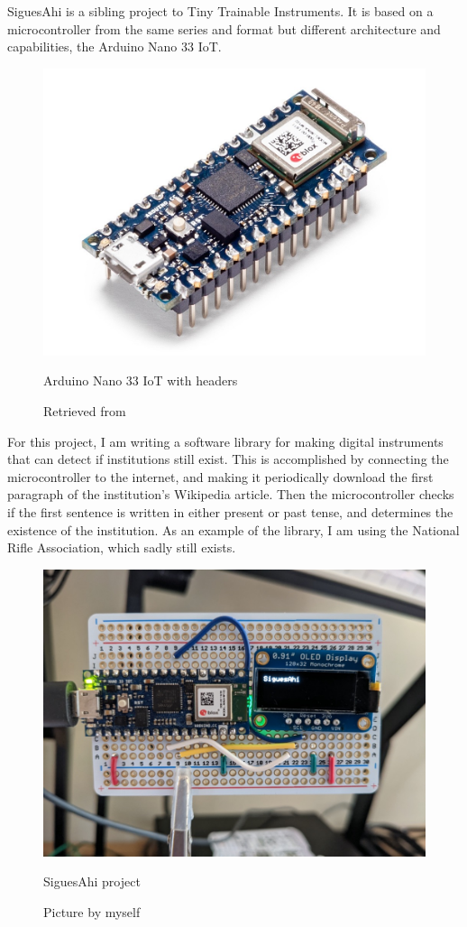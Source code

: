 SiguesAhi is a sibling project to Tiny Trainable Instruments. It is based on a microcontroller from the same series and format but different architecture and capabilities, the Arduino Nano 33 IoT.

\begin{figure}[ht]
  \centering
  \includegraphics[width=0.75\linewidth,height=0.20\textheight,keepaspectratio]{images/arduino-nano-33-iot-with-headers.jpg}
  \caption{Arduino Nano 33 IoT with headers}
  \caption*{Retrieved from \cite{website-arduino-nano-33-iot-with-headers}}
  \label{}
\end{figure}

For this project, I am writing a software library for making digital instruments that can detect if institutions still exist. This is accomplished by connecting the microcontroller to the internet, and making it periodically download the first paragraph of the institution's Wikipedia article. Then the microcontroller checks if the first sentence is written in either present or past tense, and determines the existence of the institution. As an example of the library, I am using the National Rifle Association, which sadly still exists.

\begin{figure}[ht]
  \centering
  \includegraphics[width=0.75\linewidth,height=0.25\textheight,keepaspectratio]{images/siguesahi.jpg}
  \caption{SiguesAhi project}
  \caption*{Picture by myself}
  \label{fig:siguesahi}
\end{figure}

